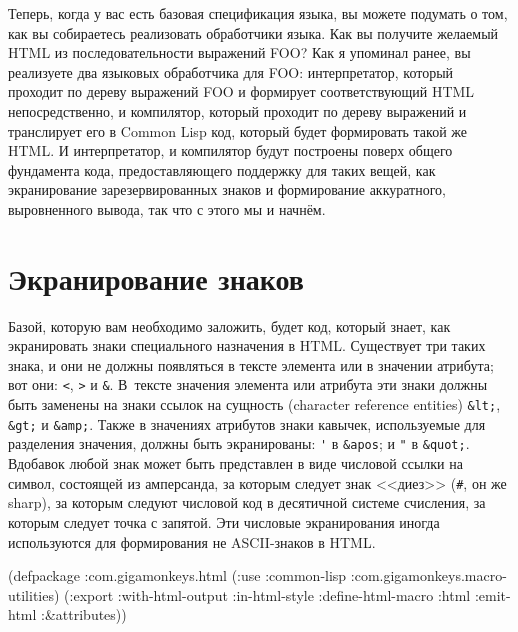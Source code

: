 Теперь, когда у вас есть базовая спецификация языка, вы можете подумать о том, как вы
собираетесь реализовать обработчики языка. Как вы получите желаемый HTML из
последовательности выражений FOO? Как я упоминал ранее, вы реализуете два языковых
обработчика для FOO: интерпретатор, который проходит по дереву выражений FOO и формирует
соответствующий HTML непосредственно, и компилятор, который проходит по дереву выражений и
транслирует его в Common Lisp код, который будет формировать такой же HTML. И
интерпретатор, и компилятор будут построены поверх общего фундамента кода, предоставляющего
поддержку для таких вещей, как экранирование зарезервированных знаков и формирование
аккуратного, выровненного вывода, так что с этого мы и начнём.

\section{Экранирование знаков}

Базой, которую вам необходимо заложить, будет код, который знает, как экранировать знаки
специального назначения в HTML. Существует три таких знака, и они не должны появляться в
тексте элемента или в значении атрибута; вот они: \lstinline{<}, \lstinline{>} и
\lstinline!&!. В~тексте значения элемента или атрибута эти знаки должны быть заменены на
знаки ссылок на сущность (character reference entities) \lstinline!&lt;!, \lstinline!&gt;!
и \lstinline!&amp;!. Также в значениях атрибутов знаки кавычек, используемые для
разделения значения, должны быть экранированы: \lstinline!'! в \lstinline!&apos!; и
\lstinline!"! в \lstinline!&quot;!. Вдобавок любой знак может быть представлен в виде
числовой ссылки на символ, состоящей из амперсанда, за которым следует знак <<диез>>
(\lstinline!#!, он же sharp), за которым следуют числовой код в десятичной системе
счисления, за которым следует точка с запятой. Эти числовые экранирования иногда
используются для формирования не ASCII-знаков в HTML.

\begin{lrbox}{\chthreezeroone}
  \begin{minipage}{\linewidth}
\begin{myverb}
(defpackage :com.gigamonkeys.html
  (:use :common-lisp :com.gigamonkeys.macro-utilities)
  (:export :with-html-output
           :in-html-style
           :define-html-macro
           :html
           :emit-html
           :\&attributes))
\end{myverb}
  \end{minipage}
\end{lrbox}


